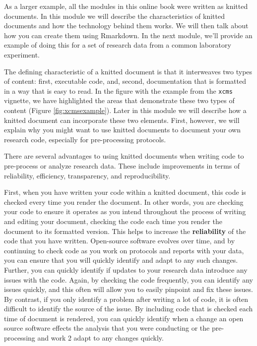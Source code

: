 \documentclass[]{tufte-book}
\begin{document}
As a larger example, all the modules in this online book were written as knitted
documents. In this module we will describe the characteristics of knitted
documents and how the technology behind them works. We will then talk about how
you can create them using Rmarkdown. In the next module, we'll provide an
example of doing this for a set of research data from a common laboratory
experiment.

The defining characteristic of a knitted document is that it interweaves two
types of content: first, executable code, and, second, documentation that is
formatted in a way that is easy to read. In the figure with the example from the
\texttt{xcms} vignette, we have highlighted the areas that demonstrate these two types
of content (Figure \ref{fig:xcmsexample}). Later in this module we will
describe how a knitted document can incorporate these two elements. First,
however, we will explain why you might want to use knitted documents to
document your own research code, especially for pre-processing protocols.

There are several advantages to using knitted documents when writing code to
pre-process or analyze research data. These include improvements in terms of
reliability, efficiency, transparency, and reproducibility.

First, when you have written your code within a knitted document, this code is
checked every time you render the document. In other words, you are checking
your code to ensure it operates as you intend throughout the process of writing
and editing your document, checking the code each time you render the document
to its formatted version. This helps to increase the \textbf{reliability} of the code
that you have written. Open-source software evolves over time, and by continuing
to check code as you work on protocols and reports with your data, you can
ensure that you will quickly identify and adapt to any such changes. Further,
you can quickly identify if updates to your research data introduce any issues
with the code. Again, by checking the code frequently, you can identify any
issues quickly, and this often will allow you to easily pinpoint and fix these
issues. By contrast, if you only identify a problem after writing a lot of code,
it is often difficult to identify the source of the issue. By including code
that is checked each time of document is rendered, you can quickly identify when
a change an open source software effects the analysis that you were conducting
or the pre-processing and work 2 adapt to any changes quickly.
\end{document}
